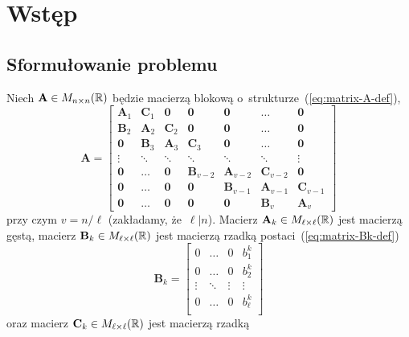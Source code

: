 \documentclass[../main.tex]{subfiles}
\newcommand{\Zero}{\mathbf{0}}
\newcommand{\AAA}{\mathbf{A}}
\newcommand{\BBB}{\mathbf{B}}
\newcommand{\CCC}{\mathbf{C}}
\begin{document}
  \chapter{Wstęp}

  \section{Sformułowanie problemu}
    Niech \( \AAA \in M_{n \times n}(\RR) \) będzie macierzą blokową
    o~strukturze~(\ref{eq:matrix-A-def}),
    \begin{equation} \label{eq:matrix-A-def}
      \AAA = \begin{bmatrix}
        \AAA_1 & \CCC_1 & \Zero  & \Zero      & \Zero       & \hdots      & \Zero       \\
        \BBB_2 & \AAA_2 & \CCC_2 & \Zero      & \Zero       & \hdots      & \Zero       \\
        \Zero  & \BBB_3 & \AAA_3 & \CCC_3     & \Zero       & \hdots      & \Zero       \\
        \vdots & \ddots & \ddots & \ddots     & \ddots      & \ddots      & \vdots      \\
        \Zero  & \hdots & \Zero  & \BBB_{v-2} & \AAA_{v-2}  & \CCC_{v-2}  & \Zero       \\
        \Zero  & \hdots & \Zero  & \Zero      & \BBB_{v-1}  & \AAA_{v-1}  & \CCC_{v-1}  \\
        \Zero  & \hdots & \Zero  & \Zero      & \Zero       & \BBB_v      & \AAA_v
      \end{bmatrix}
    \end{equation}
    przy czym \( v = n / \ell \) (zakładamy, że~\( \ell | n \)).
    Macierz \( \AAA_k \in M_{\ell \times \ell}(\RR) \) jest macierzą gęstą,
    macierz \( \BBB_k \in M_{\ell \times \ell}(\RR) \) jest macierzą rzadką
    postaci~(\ref{eq:matrix-Bk-def})
    \begin{equation} \label{eq:matrix-Bk-def}
      \BBB_k = \begin{bmatrix}
        0       & \hdots & 0      & b^k_1     \\
        0       & \hdots & 0      & b^k_2     \\
        \vdots  & \ddots & \vdots & \vdots    \\
        0       & \hdots & 0      & b^k_\ell  \\
      \end{bmatrix}
    \end{equation}
    oraz macierz \( \CCC_k \in M_{\ell \times \ell}(\RR) \) jest macierzą rzadką
\end{document}
